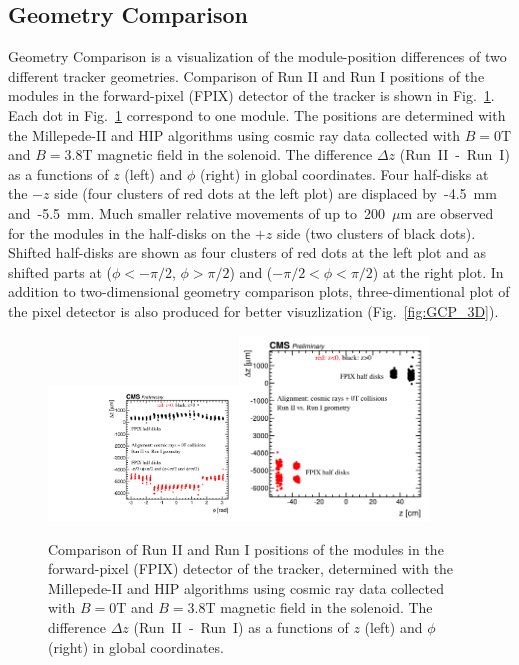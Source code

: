 \subsection{Geometry Comparison}
\label{sec:AlRes_GCP}

Geometry Comparison is a visualization of the module-position differences of two different tracker geometries. Comparison of Run II and Run I positions of the modules in the forward-pixel (FPIX) detector of the tracker is shown in Fig.~\ref{fig:GCP_FPIX}. Each dot in Fig.~\ref{fig:GCP_FPIX} correspond to one module. The positions are determined with the Millepede-II and HIP algorithms using cosmic ray data collected with $B=0$T and $B=3.8$T magnetic field in the solenoid. The difference $\Delta z$ (Run~II~-~Run~I) as a functions of $z$ (left) and $\phi$ (right) in global coordinates. Four half-disks at the $-z$ side (four clusters of red dots at the left plot) are displaced by~-4.5~mm and~-5.5~mm. Much smaller relative movements of up to~200~$\mu$m are observed for the modules in the half-disks on the $+z$ side (two clusters of black dots). Shifted half-disks are shown as four clusters of red dots at the left plot and as shifted parts at ($\phi<-\pi/2$, $\phi>\pi/2$) and ($-\pi/2<\phi<\pi/2$) at the right plot. In addition to two-dimensional geometry comparison plots, three-dimentional plot of the pixel detector is also produced for better visuzlization (Fig.~\ref{fig:GCP_3D}).

\begin{figure}[htb]
    \begin{center}
        \includegraphics[width=0.45\textwidth]{../figs/Alignment/AlRes_phi_vs_dz_PXF_1.pdf}\includegraphics[width=0.45\textwidth]{../figs/Alignment/AlRes_z_vs_dz_PXF_1.png}
    \end{center}
    \caption{Comparison of Run II and Run I positions of the modules in the forward-pixel (FPIX) detector of the tracker, determined with the Millepede-II and HIP algorithms using cosmic ray data collected with $B=0$T and $B=3.8$T magnetic field in the solenoid. The difference $\Delta z$ (Run~II~-~Run~I) as a functions of $z$ (left) and $\phi$ (right) in global coordinates.}
    \label{fig:GCP_FPIX}
\end{figure}

